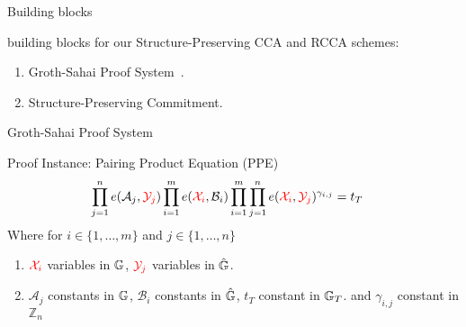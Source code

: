 
\begin{frame}{Building blocks}
  \begin{block}{building blocks for our Structure-Preserving CCA and RCCA schemes:}
    \begin{enumerate}
    \item Groth-Sahai Proof System~\cite{DBLP:conf/eurocrypt/GrothS08}.
    \item Structure-Preserving Commitment.
    \end{enumerate}
  \end{block}
\end{frame}


\begin{frame}{Groth-Sahai Proof System}
  \begin{block}{Proof Instance: Pairing Product Equation (PPE)}
    \begin{align*}
      \prod^{n}_{j=1} e(\mathcal{A}_j, {\color{red}\mathcal{Y}_j}) \prod^{m}_{i=1}e({\color{red}\mathcal{X}_i}, \mathcal{B}_i)\prod^{m}_{i=1} \prod^{n}_{j=1}e({\color{red}\mathcal{X}_i}, {\color{red}\mathcal{Y}_j})^{\gamma_{i,j}} &= t_T
    \end{align*}
    Where for $i \in \{1, \dots, m\}$ and $j \in \{1, \dots, n\}$
    \begin{enumerate}
    \item ${\color{red}\mathcal{X}_i}$ variables in $\mathbb{G}$, ${\color{red}\mathcal{Y}_j}$ variables in $\hat{\mathbb{G}}$.
    \item $\mathcal{A}_j$ constants in $\mathbb{G}$, $\mathcal{B}_i$ constants in $\hat{\mathbb{G}}$, $t_T$ constant in $\mathbb{G}_T$. and $\gamma_{i,j}$ constant in $\mathbb{Z}_n$
    \end{enumerate}
  \end{block}
  
\end{frame}

